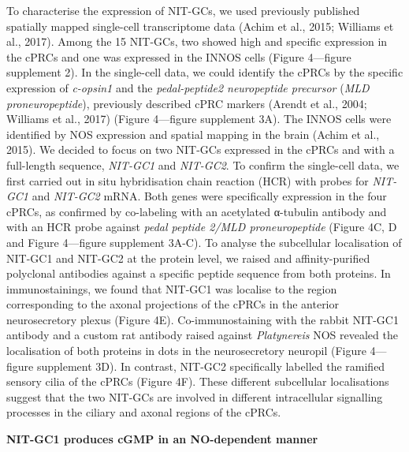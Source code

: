 \documentclass[
  10pt,
  onecolumn]{article}
\begin{document}
To characterise the expression of NIT-GCs, we used previously published
spatially mapped single-cell transcriptome data (Achim et al., 2015;
Williams et al., 2017). Among the 15 NIT-GCs, two showed high and
specific expression in the cPRCs and one was expressed in the INNOS
cells (Figure 4---figure supplement 2). In the single-cell data, we
could identify the cPRCs by the specific expression of \emph{c-opsin1}
and the \emph{pedal-peptide2 neuropeptide precursor} (\emph{MLD
proneuropeptide}), previously described cPRC markers (Arendt et al.,
2004; Williams et al., 2017) (Figure 4---figure supplement 3A). The
INNOS cells were identified by NOS expression and spatial mapping in the
brain (Achim et al., 2015). We decided to focus on two NIT-GCs expressed
in the cPRCs and with a full-length sequence, \emph{NIT-GC1} and
\emph{NIT-GC2}. To confirm the single-cell data, we first carried out in
situ hybridisation chain reaction (HCR) with probes for \emph{NIT-GC1}
and \emph{NIT-GC2} mRNA. Both genes were specifically expression in the
four cPRCs, as confirmed by co-labeling with an acetylated α-tubulin
antibody and with an HCR probe against \emph{pedal peptide 2/MLD
proneuropeptide} (Figure 4C, D and Figure 4---figure supplement 3A-C).
To analyse the subcellular localisation of NIT-GC1 and NIT-GC2 at the
protein level, we raised and affinity-purified polyclonal antibodies
against a specific peptide sequence from both proteins. In
immunostainings, we found that NIT-GC1 was localise to the region
corresponding to the axonal projections of the cPRCs in the anterior
neurosecretory plexus (Figure 4E). Co-immunostaining with the rabbit
NIT-GC1 antibody and a custom rat antibody raised against
\emph{Platynereis} NOS revealed the localisation of both proteins in
dots in the neurosecretory neuropil (Figure 4---figure supplement 3D).
In contrast, NIT-GC2 specifically labelled the ramified sensory cilia of
the cPRCs (Figure 4F). These different subcellular localisations suggest
that the two NIT-GCs are involved in different intracellular signalling
processes in the ciliary and axonal regions of the cPRCs.

\textbf{NIT-GC1 produces cGMP in an NO-dependent manner}
\end{document}
